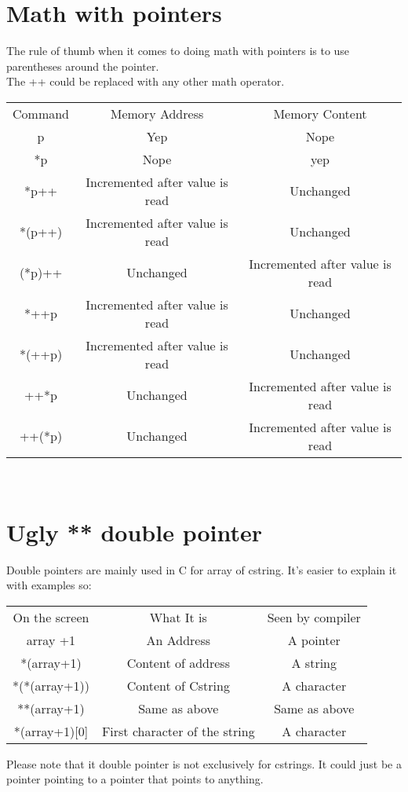 \documentclass[a4paper]{article}
\begin{document}
\section{Math with pointers}
The rule of thumb when it comes to doing math with pointers is to use parentheses around the pointer. \\
The ++ could be replaced with any other math operator.\\
\begin{table}[h]
\centering
\begin{tabular}{ccc}
Command & Memory Address                  & Memory Content                  \\
p       & Yep                             & Nope                            \\
*p      & Nope                            & yep                             \\
*p++    & Incremented after value is read & Unchanged                       \\
*(p++)  & Incremented after value is read & Unchanged                       \\
(*p)++  & Unchanged                       & Incremented after value is read \\
*++p    & Incremented after value is read & Unchanged                       \\
*(++p)  & Incremented after value is read & Unchanged                       \\
++*p    & Unchanged                       & Incremented after value is read \\
++(*p)  & Unchanged                       & Incremented after value is read
\end{tabular}
\end{table}\\

\section{Ugly ** double pointer }
Double pointers are mainly used in C for array of cstring. It's easier to explain it with examples so: 


\begin{table}[h]
\centering
\begin{tabular}{ccc}
On the screen  & What It is    & Seen by compiler 
\\
array +1	& 	An Address & 	A pointer
\\
*(array+1) & Content of address & A string
\\
*(*(array+1))  & Content of Cstring & A character
\\
**(array+1) & Same as above & Same as above
\\
*(array+1)[0] & First character of the string & A character

\end{tabular}
\end{table}
Please note that it double pointer is not exclusively for cstrings. It could just be a pointer pointing to a pointer that points to anything. \\
\end{document}
